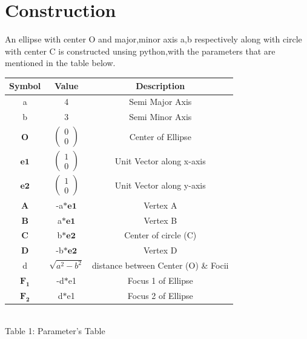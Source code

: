 \documentclass[journal,10pt,twocolumn]{article}
\let\vec\mathbf
\newcommand{\myvec}[1]{\ensuremath{\begin{pmatrix}#1\end{pmatrix}}}
\begin{document}
\section*{Construction}
\raggedright An ellipse with center O and major,minor axis a,b respectively along with circle with center C is constructed unsing python,with the parameters that are mentioned in the table below.
\vspace{5mm}
\begin{center}
    \setlength{\arrayrulewidth}{0.1mm}
	\setlength{\tabcolsep}{10pt}
	\renewcommand{\arraystretch}{1.5}
\begin{tabular}{|c|c|c|}
	\hline 
    \textbf{Symbol} & \textbf{Value} & \textbf{Description}\\ 		\hline
    a & 4 & Semi Major Axis \\ \hline
    b & 3 & Semi Minor Axis \\ \hline
    $\vec{O}$ & $\myvec{0 \\ 0}$ & Center of Ellipse \\ \hline
    $\vec{e1}$ & $\myvec{1 \\ 0}$ & Unit Vector along x-axis \\ 		\hline
    $\vec{e2}$ & $\myvec{1 \\ 0}$ & Unit Vector along y-axis\\ 			\hline
    $\vec{A}$ & -a$\ast\vec{e1}$ & Vertex A \\ \hline
    $\vec{B}$ & a$\ast\vec{e1}$ & Vertex B \\ \hline
    $\vec{C}$ & b$\ast\vec{e2}$ & Center of circle (C) \\ \hline
    $\vec{D}$ & -b$\ast\vec{e2}$ & Vertex D \\ \hline
    d & $\sqrt{a^2 - b^2}$ & distance between Center (O) \& Focii 	\\ \hline
    $\vec{F_1}$ & -d$\ast$e1 & Focus 1 of Ellipse \\ \hline
    $\vec{F_2}$ & d$\ast$e1 & Focus 2 of Ellipse \\ \hline
\end{tabular}\\ \vspace{2mm}
Table 1: Parameter's Table
\end{center}
\end{document}
